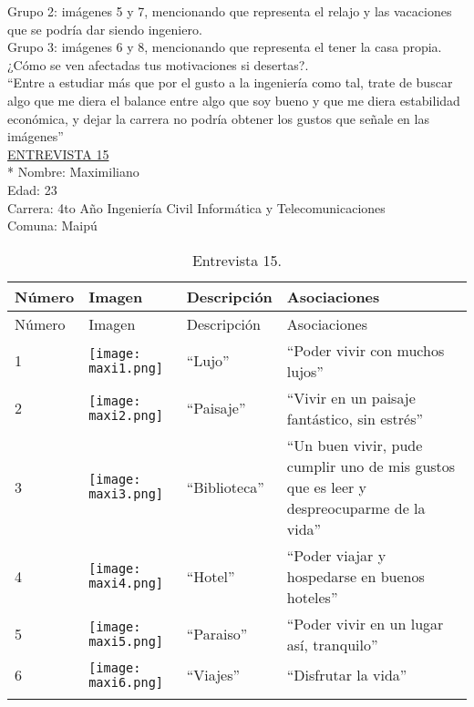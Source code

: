 Grupo 2: imágenes 5 y 7, mencionando que representa el relajo y las vacaciones que se podría dar siendo ingeniero.\\

Grupo 3: imágenes 6 y 8, mencionando que representa el tener la casa propia.\\

¿Cómo se ven afectadas tus motivaciones si desertas?.\\

``Entre a estudiar más que por el gusto a la ingeniería como tal, trate de buscar algo que me diera el balance entre algo que soy bueno y que me diera estabilidad económica, y dejar la carrera no podría obtener los gustos que señale en las imágenes'' \\


\underline {ENTREVISTA 15}\\*
Nombre: Maximiliano\\
Edad: 23\\
Carrera: 4to Año Ingeniería Civil Informática y Telecomunicaciones \\
Comuna: Maipú\\

\begin{longtable}{>{\centering\arraybackslash}m{1cm} >{\centering\arraybackslash}m{2cm} >{\arraybackslash}m{5cm}>{\arraybackslash}m{5cm}}
	
	\hline
	Número & Imagen & Descripción & Asociaciones \\
	\hline \hline
	\endfirsthead
	
	\hline
	Número & Imagen & Descripción & Asociaciones \\
	\hline \hline
	\endhead

1 & \texttt{[image: maxi1.png]} & ``Lujo'' & ``Poder vivir con muchos lujos'' \\
\hline

2 & \texttt{[image: maxi2.png]} & ``Paisaje'' & ``Vivir en un paisaje fantástico, sin estrés'' \\
\hline

3 & \texttt{[image: maxi3.png]} & ``Biblioteca'' & ``Un buen vivir, pude cumplir uno de mis gustos que es leer y despreocuparme de la vida'' \\
\hline

4 & \texttt{[image: maxi4.png]} & ``Hotel'' & ``Poder viajar y hospedarse en buenos hoteles'' \\
\hline

5 & \texttt{[image: maxi5.png]} & ``Paraiso'' & ``Poder vivir en un lugar así, tranquilo'' \\
\hline

6 & \texttt{[image: maxi6.png]} & ``Viajes'' & ``Disfrutar la vida'' \\
\hline

\caption{Entrevista 15.}
\label{tabla:maxi}
\end{longtable}

